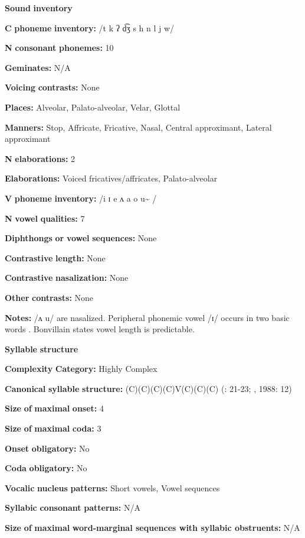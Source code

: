 \begin{styleBody}
\textbf{Sound} \textbf{inventory}

\textbf{C} \textbf{phoneme} \textbf{inventory:} /t k ʔ d͡ʒ s h n l j w/

\textbf{N} \textbf{consonant} \textbf{phonemes:} 10

\textbf{Geminates:} N/A

\textbf{Voicing} \textbf{contrasts:} None

\textbf{Places:} Alveolar, Palato-alveolar, Velar, Glottal

\textbf{Manners:} Stop, Affricate, Fricative, Nasal, Central approximant, Lateral approximant

\textbf{N} \textbf{elaborations:} 2

\textbf{Elaborations:} Voiced fricatives/affricates, Palato-alveolar

\textbf{V} \textbf{phoneme} \textbf{inventory:} /i ɪ e ʌ a o u\~{} /

\textbf{N} \textbf{vowel} \textbf{qualities:} 7

\textbf{Diphthongs} \textbf{or} \textbf{vowel} \textbf{sequences:} None

\textbf{Contrastive} \textbf{length:} None

\textbf{Contrastive} \textbf{nasalization:} None

\textbf{Other} \textbf{contrasts:} None

\textbf{Notes:} /ʌ u/ are nasalized. Peripheral phonemic vowel /ɪ/ occurs in two basic words \citep[43]{Bonvillain1973}. Bonvillain states vowel length is predictable.

\textbf{Syllable} \textbf{structure}

\textbf{Complexity} \textbf{Category:} Highly Complex

\textbf{Canonical} \textbf{syllable} \textbf{structure:} (C)(C)(C)(C)V(C)(C)(C) (\citealt{Bonvillain1973}: 21-23; \citealt{Michelson1981}, 1988: 12)

\textbf{Size} \textbf{of} \textbf{maximal} \textbf{onset:} 4

\textbf{Size} \textbf{of} \textbf{maximal} \textbf{coda:} 3

\textbf{Onset} \textbf{obligatory:} No

\textbf{Coda} \textbf{obligatory:} No

\textbf{Vocalic} \textbf{nucleus} \textbf{patterns:} Short vowels, Vowel sequences

\textbf{Syllabic} \textbf{consonant} \textbf{patterns:} N/A

\textbf{Size} \textbf{of} \textbf{maximal} \textbf{word{}-marginal sequences with syllabic obstruents:} N/A


\end{styleBody}
